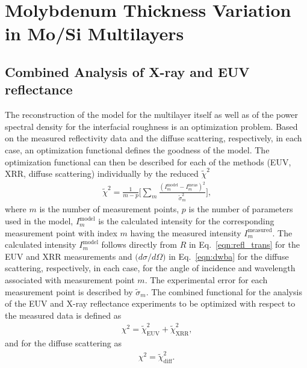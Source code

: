 \section{Molybdenum Thickness Variation in Mo/Si Multilayers}

\subsection{Combined Analysis of X-ray and EUV reflectance}
The reconstruction of the model for the multilayer itself as well as of the power spectral density for the interfacial roughness is an optimization problem. Based on the measured reflectivity data and the diffuse scattering, respectively, in each case, an optimization functional defines the goodness of the model. The optimization functional can then be described for each of the methods (EUV, XRR, diffuse scattering) individually by the reduced $\tilde{\chi}^2$
\begin{align}
\tilde{\chi}^2 = \frac{1}{m - p} \bigg[\sum\limits_{m} \frac{(I_m^\text{model} 
- I_m^\text{meas})^2}{\tilde{\sigma}_m^2} \bigg] \text{,} 
\label{eqn:reduced_chi_2}
\end{align}
where $m$ is the number of measurement points, $p$ is the number of parameters used in the model, $I_m^\text{model}$ is the calculated intensity for the corresponding measurement point with index $m$ having the measured intensity $I_m^\text{measured}$. The calculated intensity $I_m^\text{model}$ follows directly from $R$ in Eq.~\eqref{eqn:refl_trans} for the EUV and XRR measurements and $\big(d \sigma/d \Omega\big)$ in Eq.~\eqref{eqn:dwba} for the diffuse scattering, respectively, in each case, for the angle of incidence and wavelength associated with measurement point $m$. The experimental error for each measurement point is described by $\tilde{\sigma}_m$. The combined functional for the analysis of the EUV and X-ray reflectance experiments to be optimized with respect to the measured data is defined as
\begin{align}
\chi^2 = \tilde{\chi}^2_\text{EUV} +\tilde{\chi}^2_\text{XRR} \text{,}
\label{eqn:total_chi_2}
\end{align}
and for the diffuse scattering as
\begin{align}
\chi^2 = \tilde{\chi}^2_\text{diff} \text{.} \label{eqn:total_chi_2_diffuse}
\end{align}
